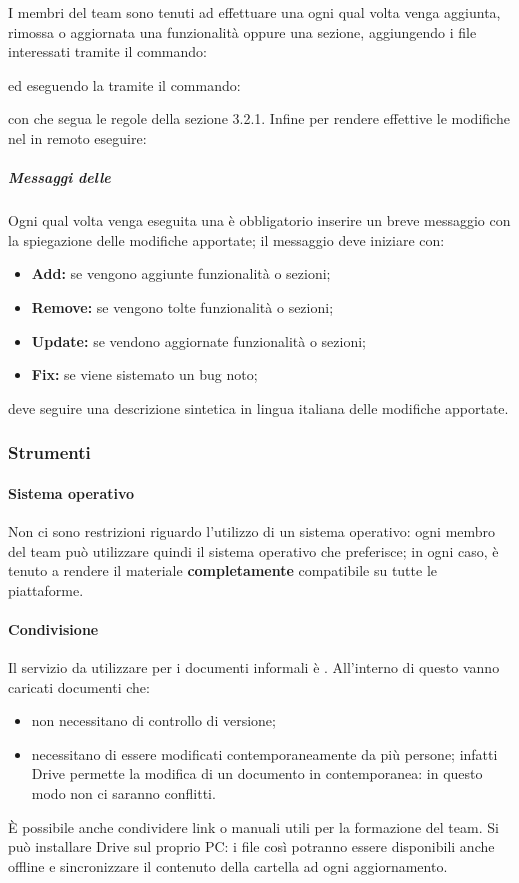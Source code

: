 		I membri del team sono tenuti ad effettuare una  ogni qual volta venga aggiunta, rimossa o aggiornata una funzionalità oppure una sezione, aggiungendo i file interessati tramite il commando:
		\begin{center}
		\end{center}
		ed eseguendo la  tramite il commando:
		\begin{center}
		\end{center}
		con  che segua le regole della sezione 3.2.1.
		Infine per rendere effettive le modifiche nel  in remoto eseguire:
		\begin{center}
		\end{center}
		\subparagraph{Messaggi delle }
		Ogni qual volta venga eseguita una  è obbligatorio inserire un breve messaggio con la spiegazione
		delle modifiche apportate; il messaggio deve iniziare con:
		\begin{itemize}
			\item \textbf{Add:} se vengono aggiunte funzionalità o sezioni;
			\item \textbf{Remove:} se vengono tolte funzionalità o sezioni;
			\item \textbf{Update:} se vendono aggiornate funzionalità o sezioni;
			\item \textbf{Fix:} se viene sistemato un bug noto;
		\end{itemize}
		deve seguire una descrizione sintetica in lingua italiana delle modifiche apportate.
\subsubsection{Strumenti}
	\paragraph{Sistema operativo}
	Non ci sono restrizioni riguardo l'utilizzo di un sistema operativo: ogni membro del team può utilizzare quindi il sistema operativo che preferisce; in ogni caso, è tenuto a rendere il materiale  \textbf{completamente} compatibile su tutte le piattaforme.
	\paragraph{Condivisione}
	Il servizio da utilizzare per i documenti informali è .
	All'interno di questo  vanno caricati documenti che:
	\begin{itemize}
		\item non necessitano di controllo di versione;
		\item necessitano di essere modificati contemporaneamente da più persone; infatti  Drive permette la modifica di un documento in contemporanea: in questo modo non ci saranno conflitti.
	\end{itemize}
	È possibile anche condividere link o manuali utili per la formazione del team. Si può installare  Drive sul proprio PC: i file così potranno essere disponibili anche offline e sincronizzare il contenuto della cartella ad ogni aggiornamento.
